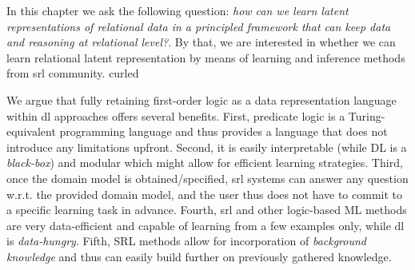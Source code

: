 In this chapter we ask the following question: \textit{how can we learn latent representations of relational data in a principled framework that can keep data and reasoning at relational level?}.
By that, we are interested in whether we can learn relational latent representation by means of learning and inference methods from \gls{srl} community.
\gls{curled}


We argue that fully retaining first-order logic as a data representation language within \gls{dl} approaches offers several benefits. 
First, predicate logic is a Turing-equivalent programming language and thus provides a language that does not introduce any limitations upfront. 
Second, it is easily interpretable (while DL is a \textit{black-box}) and modular which might allow for efficient learning strategies.
Third, once the domain model is obtained/specified, \gls{srl} systems can answer any question w.r.t. the provided domain model, and the user thus does not have to commit to a specific learning task in advance. 
Fourth, \gls{srl} and other logic-based ML methods are very data-efficient and capable of learning from a few examples only, while \gls{dl} is \textit{data-hungry}.
Fifth, SRL methods allow for incorporation of \textit{background knowledge} and thus can easily build further on previously gathered knowledge.






